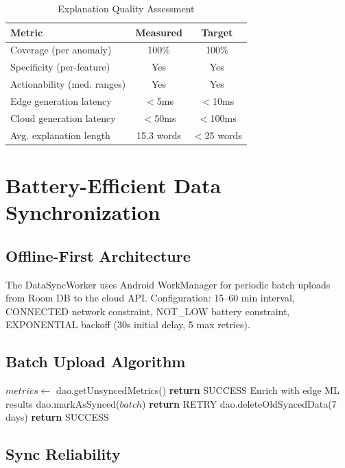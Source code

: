 \begin{table}[H]
\centering
\caption{Explanation Quality Assessment}
\label{tab:xai_quality}
\begin{tabular}{lcc}
\toprule
\textbf{Metric} & \textbf{Measured} & \textbf{Target} \\
\midrule
Coverage (per anomaly) & 100\% & 100\% \\
Specificity (per-feature) & Yes & Yes \\
Actionability (med. ranges) & Yes & Yes \\
Edge generation latency & $<$5ms & $<$10ms \\
Cloud generation latency & $<$50ms & $<$100ms \\
Avg. explanation length & 15.3 words & $<$25 words \\
\bottomrule
\end{tabular}
\end{table}

\section{Battery-Efficient Data Synchronization}

\subsection{Offline-First Architecture}
The DataSyncWorker uses Android WorkManager for periodic batch uploads from Room DB to the cloud API. Configuration: 15--60 min interval, CONNECTED network constraint, NOT\_LOW battery constraint, EXPONENTIAL backoff (30s initial delay, 5 max retries).

\subsection{Batch Upload Algorithm}
\begin{algorithmic}
\STATE $metrics \leftarrow$ dao.getUnsyncedMetrics()
 \STATE \textbf{return} SUCCESS \ENDIF
{}
    \STATE Enrich with edge ML results
        \STATE dao.markAsSynced($batch$)
    \ELSE
        \STATE \textbf{return} RETRY
    \ENDIF
\ENDFOR
\STATE dao.deleteOldSyncedData(7 days)
\STATE \textbf{return} SUCCESS
\end{algorithmic}

\subsection{Sync Reliability}

